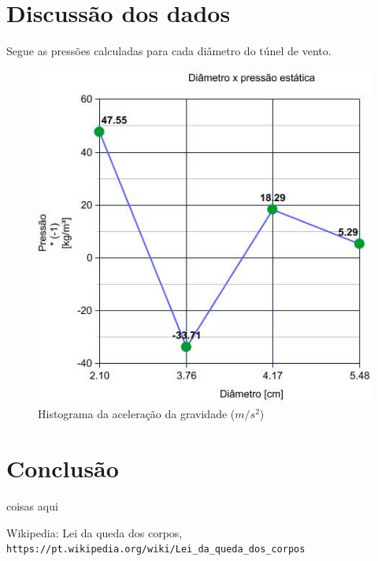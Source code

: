 \documentclass[a4paper]{article}
\begin{document}
\section{Discussão dos dados}
    Segue as pressões calculadas para cada diâmetro do túnel de vento.
        \begin{center}
            \begin{figure}[H]
              \includegraphics[width=.6\linewidth]{img/graph.jpg}
              \caption{Histograma da aceleração da gravidade ($ m/s^2 $)}
              \label{fig:graph}
            \end{figure}
        \end{center}

\section{Conclusão}
    coisas aqui

\begin{thebibliography}{1}

    Wikipedia: Lei da queda dos corpos,
    \\\texttt{https://pt.wikipedia.org/wiki/Lei\_da\_queda\_dos\_corpos}
\end{thebibliography}
\end{document}
